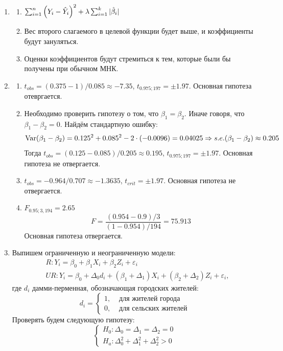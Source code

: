 \begin{enumerate}
\item
\begin{enumerate}
  \item $\sum_{i=1}^n \left(Y_i - \hat Y_i \right)^2 + \lambda \sum_{i=1}^k
  \vert \hat{\beta}_i \vert$
  \item Вес второго слагаемого в целевой функции будет выше, и коэффициенты будут
  зануляться.
  \item Оценки коэффициентов будут стремиться к тем, которые были бы получены
  при обычном МНК.
\end{enumerate}
\item
\begin{enumerate}
  \item $t_{obs} = (0.375 - 1) / 0.085 \approx -7.35$, $t_{0.975; 197} = \pm 1.97$.
  Основная гипотеза отевргается.
  \item Необходимо проверить гипотезу о том, что $\beta_1 = \beta_2$. Иначе говоря,
  что $\beta_1 - \beta_2 = 0$. Найдём стандартную ошибку:
  \[
  \operatorname{Var}(\beta_1 - \beta_2) = 0.125^2 + 0.085^2 - 2 \cdot (-0.0096) = 0.04025 \Rightarrow
  s.e.(\beta_1 - \beta_2) \approx 0.205
  \]
  Тогда $t_{obs} = (0.125 - 0.085) / 0.205 \approx 0.195$, $t_{0.975; 197} = \pm 1.97$.
  Основная гипотеза не отвергается.
  \item $t_{obs} = -0.964 / 0.707 \approx -1.3635$, $t_{crit} = \pm 1.97$.
  Основная гипотеза не отвергается.
  \item $F_{0.95; 3, 194} = 2.65$
  \[
  F = \frac{(0.954 - 0.9) / 3}{(1 - 0.954) / 194} = 75.913
  \]
  Основная гипотеза отвергается.
\end{enumerate}
\item Выпишем ограниченную и неограниченную модели:
\begin{align*}
  &R: Y_i = \beta_0 + \beta_1 X_i + \beta_2 Z_i + \varepsilon_i \\
  &UR: Y_i = \beta_0 + \Delta_0 d_i + (\beta_1 + \Delta_1) X_i + (\beta_2 + \Delta_2) Z_i + \varepsilon_i,
\end{align*}
где $d_i$ дамми-перменная, обозначающая городских жителей:
\[
d_i =
\begin{cases}
1, & \text{ для жителей города} \\
0, & \text{ для сельских жителей}
\end{cases}
\]
Проверять будем следующую гипотезу:
\[
\begin{cases}
H_0: \Delta_0 = \Delta_1 = \Delta_2 = 0 \\
H_a: \Delta_0^2 + \Delta_1^2 + \Delta_2^2 > 0

\end{cases}\]
\end{enumerate}
